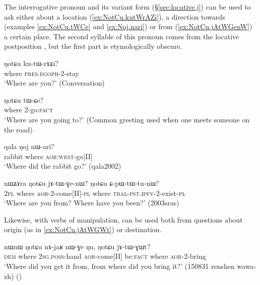 The interrogative pronoun  and its variant form  (§\ref{sec:locative.j}) can be used to ask either about a location (\ref{ex:NotCu.kutWrAZi}), a direction towards (examples \ref{ex:NotCu.tWCe} and \ref{ex:Noj.nari}) or from (\ref{ex:NotCu.jAtWGenW}) a certain place. The second syllable of this pronoun  comes from the locative postposition , but the first part is etymologically obscure.
 
\begin{exe}
\ex \label{ex:NotCu.kutWrAZi}
\gll     ŋotɕu ku-tɯ-rɤʑi?   \\
  where \textsc{pres}.\textsc{egoph}-2-stay \\
\glt `Where are you?' (Conversation)
\end{exe} 

\begin{exe}
\ex \label{ex:NotCu.tWCe}
\gll   ŋotɕu tɯ-ɕe? \\
 where 2-go:\textsc{fact} \\
\glt `Where are you going to?' (Common greeting used when one meets someone on the road)
 \end{exe} 
 
\begin{exe}
\ex \label{ex:Noj.nari}
\gll     qala ŋoj nɯ-ari?  \\
  rabbit where \textsc{aor}:\textsc{west}-go[II] \\
\glt `Where did the rabbit go?'  (qala2002)
\end{exe} 

\begin{exe}
\ex \label{ex:NotCu.jAtWGenW}
\gll  nɯʑɤra ŋotɕu jɤ-tɯ-ɣe-nɯ? ŋotɕu ɕ-pɯ-tɯ-tu-nɯ? \\
\textsc{2pl} where \textsc{aor}-2-come[II]-\textsc{pl} where \textsc{tral}-\textsc{pst}.\textsc{ipfv}-2-exist-\textsc{pl} \\
\glt `Where are you from? Where have you been?' (2003sras)
\end{exe} 

Likewise, with verbs of manipulation,  can be used both from questions about origin (as in \ref{ex:NotCu.jAtWGWt}) or destination.

\begin{exe}
\ex \label{ex:NotCu.jAtWGWt}
\gll nɯnɯ ŋotɕu nɤ-jaʁ nɯ-ɣe ŋu, ŋotɕu jɤ-tɯ-ɣɯt? \\
\textsc{dem} where \textsc{2sg}.\textsc{poss}-hand \textsc{aor}-come[II] be:\textsc{fact} where \textsc{aor}-2-bring \\
\glt `Where did you get it from, from where did you bring it?' (150831 renshen wawa-zh)
()
\end{exe} 


